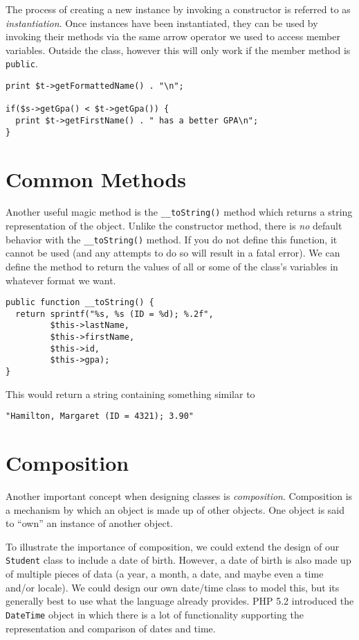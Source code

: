 The process of creating a new instance by invoking a constructor is
referred to as \emph{instantiation}.  Once instances have been instantiated,
they can be used by invoking their methods via the same arrow
operator we used to access member variables.  Outside the class, however
this will only work if the member method is \texttt{public}.

\begin{verbatim}
print $t->getFormattedName() . "\n";

if($s->getGpa() < $t->getGpa()) {
  print $t->getFirstName() . " has a better GPA\n";
}
\end{verbatim}

\section{Common Methods}


Another useful magic method is the \texttt{__toString()} 
method which returns a string representation of the object.  Unlike
the constructor method, there is \emph{no} default behavior with the
\texttt{__toString()} method.  If you do not define this
function, it cannot be used (and any attempts to do so will result
in a fatal error).  We can define the method to return the values of 
all or some of the class's variables in whatever format we want.

\begin{verbatim}
public function __toString() {
  return sprintf("%s, %s (ID = %d); %.2f", 
         $this->lastName,
         $this->firstName,
         $this->id,
         $this->gpa);
}
\end{verbatim}

This would return a string containing something similar to 

\texttt{"Hamilton, Margaret (ID = 4321); 3.90"}

\section{Composition}

Another important concept when designing classes is \emph{composition}.
Composition is a mechanism by which an object is made up of other objects.
One object is said to ``own'' an instance of another object.  

To illustrate the importance of composition, we could extend the 
design of our \texttt{Student} class to include a date of 
birth.  However, a date of birth is also made up of multiple pieces
of data (a year, a month, a date, and maybe even a time and/or locale).
We could design our own date/time class to model this, but its generally
best to use what the language already provides.  PHP 5.2 introduced the
\texttt{DateTime} object in which there is a lot of functionality
supporting the representation and comparison of dates and time.

